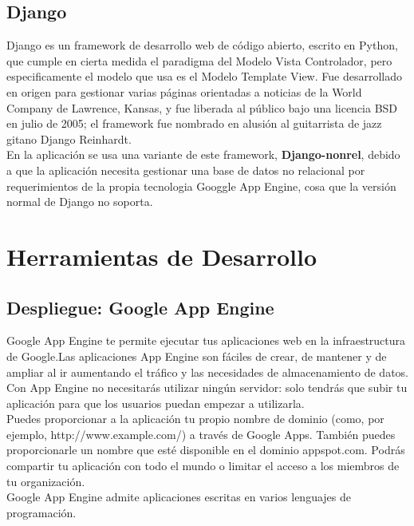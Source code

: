 \subsection{Django}
Django es un framework de desarrollo web de código abierto, escrito en Python, que cumple en cierta medida el paradigma del Modelo Vista Controlador, 
pero especificamente el modelo que usa es el Modelo Template View. Fue desarrollado en origen para gestionar varias páginas orientadas a noticias de la World Company de Lawrence, Kansas, 
y fue liberada al público bajo una licencia BSD en julio de 2005; el framework fue nombrado en alusión al guitarrista de jazz gitano Django Reinhardt.\\

En la aplicación se usa una variante de este framework, \textbf{Django-nonrel}, debido a que la aplicación necesita gestionar una base de datos no relacional por requerimientos
de la propia tecnologia Googgle App Engine, cosa que la versión normal de Django no soporta.




\section{Herramientas de Desarrollo}
\label{2:sec3}

\subsection{Despliegue: Google App Engine}
Google App Engine te permite ejecutar tus aplicaciones web en la infraestructura de Google.Las 
aplicaciones App Engine son fáciles de crear, de mantener y de ampliar al ir aumentando el tráfico 
y las necesidades de almacenamiento de datos. Con App Engine no necesitarás utilizar ningún servidor: 
solo tendrás que subir tu aplicación para que los usuarios puedan empezar a utilizarla.\\

Puedes proporcionar a la aplicación tu propio nombre de dominio (como, por ejemplo, http://www.example.com/) 
a través de Google Apps. También puedes proporcionarle un nombre que esté disponible en el dominio appspot.com. 
Podrás compartir tu aplicación con todo el mundo o limitar el acceso a los miembros de tu organización.\\

Google App Engine admite aplicaciones escritas en varios lenguajes de programación.\\

